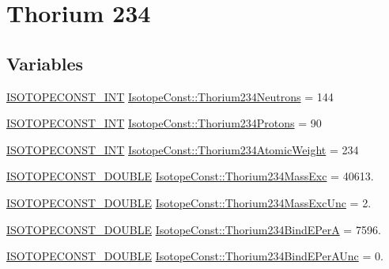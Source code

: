 \hypertarget{group___isotope_const-_thorium-_th234}{}\section{Thorium 234}
\label{group___isotope_const-_thorium-_th234}
\subsection*{Variables}
\begin{DoxyCompactItemize}
\item 
\mbox{\hyperlink{group___isotope_const-_macros_ga5f18360b3e99483a35c32d789e62621c}{I\+S\+O\+T\+O\+P\+E\+C\+O\+N\+S\+T\+\_\+\+I\+NT}} \mbox{\hyperlink{group___isotope_const-_thorium-_th234_gae6bd3cc1ef327ddd56e5f9717150ecff}{Isotope\+Const\+::\+Thorium234\+Neutrons}} = 144
\item 
\mbox{\hyperlink{group___isotope_const-_macros_ga5f18360b3e99483a35c32d789e62621c}{I\+S\+O\+T\+O\+P\+E\+C\+O\+N\+S\+T\+\_\+\+I\+NT}} \mbox{\hyperlink{group___isotope_const-_thorium-_th234_ga9f9a53cfa8edb4dbe8b8fb15ee0e6d0b}{Isotope\+Const\+::\+Thorium234\+Protons}} = 90
\item 
\mbox{\hyperlink{group___isotope_const-_macros_ga5f18360b3e99483a35c32d789e62621c}{I\+S\+O\+T\+O\+P\+E\+C\+O\+N\+S\+T\+\_\+\+I\+NT}} \mbox{\hyperlink{group___isotope_const-_thorium-_th234_gac0b6a1cda185e0e00cb05f4aa4a6d486}{Isotope\+Const\+::\+Thorium234\+Atomic\+Weight}} = 234
\item 
\mbox{\hyperlink{group___isotope_const-_macros_ga8f45a7272ce02c0b4c65c44636ed719a}{I\+S\+O\+T\+O\+P\+E\+C\+O\+N\+S\+T\+\_\+\+D\+O\+U\+B\+LE}} \mbox{\hyperlink{group___isotope_const-_thorium-_th234_gac9b02e09cac863ac8a577fe29e17ec35}{Isotope\+Const\+::\+Thorium234\+Mass\+Exc}} = 40613.
\item 
\mbox{\hyperlink{group___isotope_const-_macros_ga8f45a7272ce02c0b4c65c44636ed719a}{I\+S\+O\+T\+O\+P\+E\+C\+O\+N\+S\+T\+\_\+\+D\+O\+U\+B\+LE}} \mbox{\hyperlink{group___isotope_const-_thorium-_th234_ga8b648da6e13460527d4a976b888577e1}{Isotope\+Const\+::\+Thorium234\+Mass\+Exc\+Unc}} = 2.
\item 
\mbox{\hyperlink{group___isotope_const-_macros_ga8f45a7272ce02c0b4c65c44636ed719a}{I\+S\+O\+T\+O\+P\+E\+C\+O\+N\+S\+T\+\_\+\+D\+O\+U\+B\+LE}} \mbox{\hyperlink{group___isotope_const-_thorium-_th234_ga0391833fe963d91f662d024c2c5f9a23}{Isotope\+Const\+::\+Thorium234\+Bind\+E\+PerA}} = 7596.
\item 
\mbox{\hyperlink{group___isotope_const-_macros_ga8f45a7272ce02c0b4c65c44636ed719a}{I\+S\+O\+T\+O\+P\+E\+C\+O\+N\+S\+T\+\_\+\+D\+O\+U\+B\+LE}} \mbox{\hyperlink{group___isotope_const-_thorium-_th234_ga12ca0c601292967cea4c6b36301baf73}{Isotope\+Const\+::\+Thorium234\+Bind\+E\+Per\+A\+Unc}} = 0.

\end{DoxyCompactItemize}
